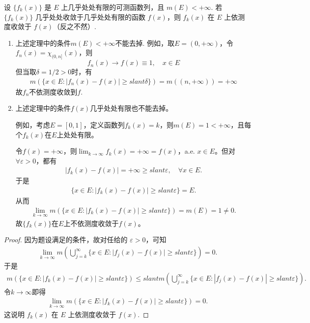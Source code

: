 \documentclass[../../main.tex]{subfiles}
\begin{document}
\begin{theorem}[Lebesgue定理]\label{theorem:几乎处处收敛在E的测度有限前提下必依测度收敛}
设 $\{f_k(x)\}$ 是 $E$ 上几乎处处有限的可测函数列，且 $m(E)<+\infty$. 若 $\{f_k(x)\}$ 几乎处处收敛于几乎处处有限的函数 $f(x)$，则 $f_k(x)$ 在 $E$ 上依测度收敛于 $f(x)$（反之不然）.
\end{theorem}
\begin{remark}
\begin{enumerate}
\item 上述定理中的条件\(m(E) < +\infty\)不能去掉. 例如，取\(E = (0, +\infty)\)，令\(f_n(x) = \chi_{(0,n]}(x)\)，则
\[f_n(x) \to f(x) \equiv 1, \quad x \in E\]
但当取\(\delta = 1/2 > 0\)时，有
\begin{align*}
m(\{x \in E : |f_n(x) - f(x)| \geqslant slant \delta\}) = m((n, +\infty)) = +\infty
\end{align*}
故\(f_n\)不依测度收敛到\(f\). 

\item 上述定理中的条件\(f(x)\)几乎处处有限也不能去掉。

例如，考虑\(E = [0, 1]\)，定义函数列\(f_k(x) = k\)，则\(m(E) = 1 < +\infty\)，且每个\(f_k(x)\)在\(E\)上处处有限。

令\(f(x) = +\infty\)，则\(\lim_{k \to \infty} f_k(x) = +\infty = f(x)\)，a.e. \(x \in E\)。但对\(\forall \varepsilon > 0\)，都有
\begin{align*}
|f_k(x) - f(x)| = +\infty \geqslant slant \varepsilon, \quad \forall x \in E.
\end{align*}
于是
\begin{align*}
\{x \in E : |f_k(x) - f(x)| \geqslant slant \varepsilon\} = E.
\end{align*}
从而
\begin{align*}
\lim_{k \to \infty} m(\{x \in E : |f_k(x) - f(x)| \geqslant slant \varepsilon\}) = m(E) = 1 \ne 0.
\end{align*}
故\(\{f_k(x)\}\)在\(E\)上不依测度收敛于\(f(x)\)。
\end{enumerate}
\end{remark}
\begin{proof}
因为题设满足的条件，故对任给的 $\varepsilon>0$，可知
\begin{align*}
\lim_{k\to\infty}m\left(\bigcup_{j = k}^{\infty}\{x\in E:\vert f_j(x)-f(x)\vert\geqslant slant\varepsilon\}\right)=0.
\end{align*}
于是
\begin{align*}
m(\{x\in E:\left| f_k(x)-f(x) \right|\geqslant slant \varepsilon \})\leqslant slant m\left( \bigcup_{j=k}^{\infty}{\{x}\in E:\left| f_j(x)-f(x) \right|\geqslant slant \varepsilon \} \right) .
\end{align*}
令$k\to \infty$即得
\begin{align*}
\lim_{k\to\infty}m(\{x\in E:\vert f_k(x)-f(x)\vert\geqslant slant\varepsilon\}) = 0.
\end{align*}
这说明 $f_k(x)$ 在 $E$ 上依测度收敛于 $f(x)$.
\end{proof}
\end{document}
